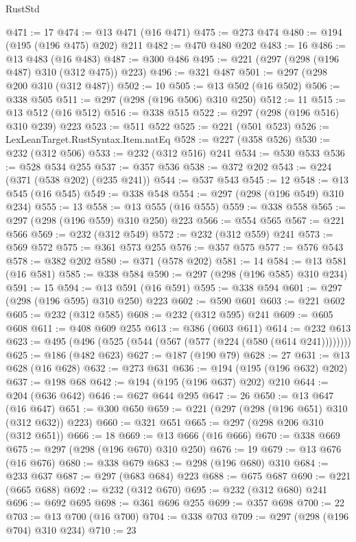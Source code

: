 \begin{lexlean}{RustStd}
\begin{coremodule}
@471 := 17
@474 := @13 @471 (@16 @471)
@475 := @273 @474
@480 := @194 (@195 (@196 @475) @202) @211
@482 := @470 @480 @202
@483 := 16
@486 := @13 @483 (@16 @483)
@487 := @300 @486
@495 := @221 (@297 (@298 (@196 @487) @310 (@312 @475)) @223)
@496 := @321 @487
@501 := @297 (@298 @200 @310 (@312 @487))
@502 := 10
@505 := @13 @502 (@16 @502)
@506 := @338 @505
@511 := @297 (@298 (@196 @506) @310 @250)
@512 := 11
@515 := @13 @512 (@16 @512)
@516 := @338 @515
@522 := @297 (@298 (@196 @516) @310 @239) @223
@523 := @511 @522
@525 := @221 (@501 @523)
@526 := LexLeanTarget.RustSyntax.Item.natEq
@528 := @227 (@358 @526)
@530 := @232 (@312 @506)
@533 := @232 (@312 @516) @241
@534 := @530 @533
@536 := @528 @534 @255
@537 := @357 @536
@538 := @372 @202
@543 := @224 (@371 (@538 @202) (@235 @241))
@544 := @537 @543
@545 := 12
@548 := @13 @545 (@16 @545)
@549 := @338 @548
@554 := @297 (@298 (@196 @549) @310 @234)
@555 := 13
@558 := @13 @555 (@16 @555)
@559 := @338 @558
@565 := @297 (@298 (@196 @559) @310 @250) @223
@566 := @554 @565
@567 := @221 @566
@569 := @232 (@312 @549)
@572 := @232 (@312 @559) @241
@573 := @569 @572
@575 := @361 @573 @255
@576 := @357 @575
@577 := @576 @543
@578 := @382 @202
@580 := @371 (@578 @202)
@581 := 14
@584 := @13 @581 (@16 @581)
@585 := @338 @584
@590 := @297 (@298 (@196 @585) @310 @234)
@591 := 15
@594 := @13 @591 (@16 @591)
@595 := @338 @594
@601 := @297 (@298 (@196 @595) @310 @250) @223
@602 := @590 @601
@603 := @221 @602
@605 := @232 (@312 @585)
@608 := @232 (@312 @595) @241
@609 := @605 @608
@611 := @408 @609 @255
@613 := @386 (@603 @611)
@614 := @232 @613
@623 := @495 (@496 (@525 (@544 (@567 (@577 (@224 (@580 (@614 @241))))))))
@625 := @186 (@482 @623)
@627 := @187 (@190 @79)
@628 := 27
@631 := @13 @628 (@16 @628)
@632 := @273 @631
@636 := @194 (@195 (@196 @632) @202)
@637 := @198 @68
@642 := @194 (@195 (@196 @637) @202) @210
@644 := @204 (@636 @642)
@646 := @627 @644 @295
@647 := 26
@650 := @13 @647 (@16 @647)
@651 := @300 @650
@659 := @221 (@297 (@298 (@196 @651) @310 (@312 @632)) @223)
@660 := @321 @651
@665 := @297 (@298 @206 @310 (@312 @651))
@666 := 18
@669 := @13 @666 (@16 @666)
@670 := @338 @669
@675 := @297 (@298 (@196 @670) @310 @250)
@676 := 19
@679 := @13 @676 (@16 @676)
@680 := @338 @679
@683 := @298 (@196 @680) @310
@684 := @233 @637
@687 := @297 (@683 @684) @223
@688 := @675 @687
@690 := @221 (@665 @688)
@692 := @232 (@312 @670)
@695 := @232 (@312 @680) @241
@696 := @692 @695
@698 := @361 @696 @255
@699 := @357 @698
@700 := 22
@703 := @13 @700 (@16 @700)
@704 := @338 @703
@709 := @297 (@298 (@196 @704) @310 @234)
@710 := 23

\end{coremodule}
\end{lexlean}
